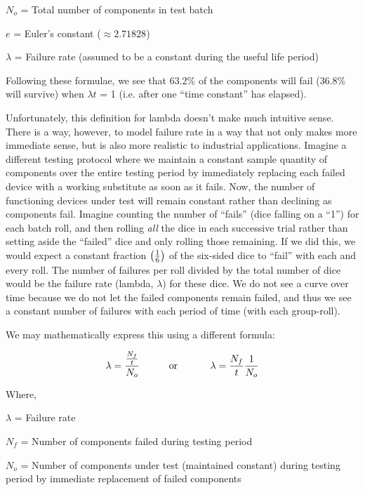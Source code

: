 $N_o$ = Total number of components in test batch

$e$ = Euler's constant ($\approx 2.71828$)

$\lambda$ = Failure rate (assumed to be a constant during the useful life period)

\vskip 10pt

Following these formulae, we see that 63.2\% of the components will fail (36.8\% will survive) when $\lambda t$ = 1 (i.e. after one ``time constant'' has elapsed).

\vskip 10pt

Unfortunately, this definition for lambda doesn't make much intuitive sense.  There is a way, however, to model failure rate in a way that not only makes more immediate sense, but is also more realistic to industrial applications.  Imagine a different testing protocol where we maintain a constant sample quantity of components over the entire testing period by immediately replacing each failed device with a working substitute as soon as it fails.  Now, the number of functioning devices under test will remain constant rather than declining as components fail.  Imagine counting the number of ``fails'' (dice falling on a ``1'') for each batch roll, and then rolling \textit{all} the dice in each successive trial rather than setting aside the ``failed'' dice and only rolling those remaining.  If we did this, we would expect a constant fraction $\left(1 \over 6\right)$ of the six-sided dice to ``fail'' with each and every roll.  The number of failures per roll divided by the total number of dice would be the failure rate (lambda, $\lambda$) for these dice.  We do not see a curve over time because we do not let the failed components remain failed, and thus we see a constant number of failures with each period of time (with each group-roll).

\filbreak

We may mathematically express this using a different formula:

$$\lambda = {{N_f \over t} \over N_o} \hbox{\hskip 30pt or \hskip 30pt} \lambda = {{N_f \over t} {1 \over N_o}}$$

\noindent
Where,

$\lambda$ = Failure rate

$N_f$ = Number of components failed during testing period

$N_o$ = Number of components under test (maintained constant) during testing period by immediate replacement of failed components

